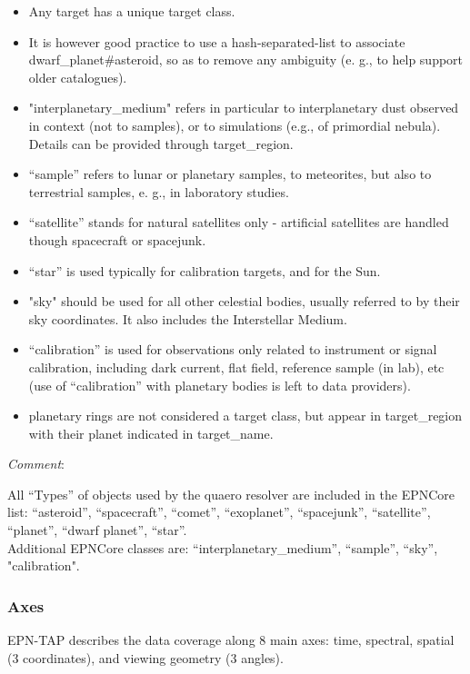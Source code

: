\documentclass[11pt,a4paper]{ivoa}
\begin{document}
\begin{itemize}
\item Any target has a unique target class.
\item It is however good practice to use a hash-separated-list to associate dwarf\_planet\#asteroid, so as to remove any ambiguity (e. g., to help support older catalogues).
\item "interplanetary\_medium" refers in particular to interplanetary dust observed in context (not to samples), or to simulations (e.g., of primordial nebula). Details can be provided through target\_region.
\item ``sample'' refers to lunar or planetary samples, to meteorites, but also to terrestrial samples, e. g., in laboratory studies.
\item ``satellite'' stands for natural satellites only - artificial satellites are handled though spacecraft or spacejunk.
\item ``star'' is used typically for calibration targets, and for the Sun.
\item "sky" should be used for all other celestial bodies, usually referred to by their sky coordinates. It also includes the Interstellar Medium.
\item ``calibration'' is used for observations only related to instrument or signal calibration, including dark current, flat field, reference sample (in lab), etc (use of ``calibration'' with planetary bodies is left to data providers).
\item planetary rings are not considered a target class, but appear in target\_region with their planet indicated in target\_name.
\end{itemize}

\emph{Comment}: 

All ``Types'' of objects used by the quaero resolver are included in the EPNCore list: ``asteroid'', ``spacecraft'', ``comet'', ``exoplanet'', ``spacejunk'', ``satellite'', ``planet'', ``dwarf planet'', ``star''.\\Additional EPNCore classes are: ``interplanetary\_medium'', ``sample'', ``sky'', "calibration".


\subsubsection{Axes}

EPN-TAP describes the data coverage along 8 main axes: time, spectral, spatial (3 coordinates), and viewing geometry (3 angles). 
\end{document}
